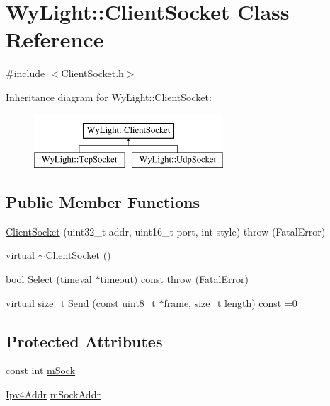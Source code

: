 \hypertarget{class_wy_light_1_1_client_socket}{\section{Wy\-Light\-:\-:Client\-Socket Class Reference}
\label{class_wy_light_1_1_client_socket}
}


{\ttfamily \#include $<$Client\-Socket.\-h$>$}

Inheritance diagram for Wy\-Light\-:\-:Client\-Socket\-:\begin{figure}[H]
\begin{center}
\leavevmode
\includegraphics[height=2.000000cm]{class_wy_light_1_1_client_socket}
\end{center}
\end{figure}
\subsection*{Public Member Functions}
\begin{DoxyCompactItemize}
\item 
\hyperlink{class_wy_light_1_1_client_socket_afe4f631abfffc996c24a8a55a9d5cea0}{Client\-Socket} (uint32\-\_\-t addr, uint16\-\_\-t port, int style)  throw (\-Fatal\-Error)
\item 
virtual \hyperlink{class_wy_light_1_1_client_socket_afba3cd05e78cb8f0c46600d3dbba22f4}{$\sim$\-Client\-Socket} ()
\item 
bool \hyperlink{class_wy_light_1_1_client_socket_a8a34f39b3bbd8b4b2901e6c4f6f2d2e9}{Select} (timeval $\ast$timeout) const   throw (\-Fatal\-Error)
\item 
virtual size\-\_\-t \hyperlink{class_wy_light_1_1_client_socket_ab5ea6d042caa7f624015d514263ab6b5}{Send} (const uint8\-\_\-t $\ast$frame, size\-\_\-t length) const =0
\end{DoxyCompactItemize}
\subsection*{Protected Attributes}
\begin{DoxyCompactItemize}
\item 
const int \hyperlink{class_wy_light_1_1_client_socket_a339a7d8dd046156f3d7c148181ac0673}{m\-Sock}
\item 
\hyperlink{struct_wy_light_1_1_ipv4_addr}{Ipv4\-Addr} \hyperlink{class_wy_light_1_1_client_socket_a3849426773c4b3e300edc8cd3b37b16a}{m\-Sock\-Addr}
\end{DoxyCompactItemize}



